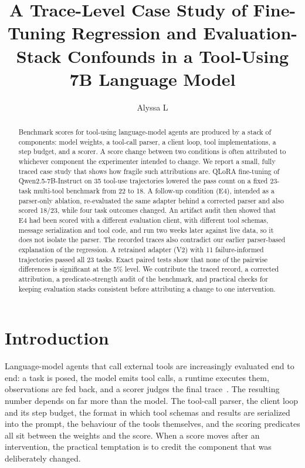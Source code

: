 \documentclass[runningheads]{llncs}
\begin{document}
%
\title{A Trace-Level Case Study of Fine-Tuning Regression and Evaluation-Stack Confounds in a Tool-Using 7B Language Model}
%
\author{Alyssa L}
%
\maketitle
%
\begin{abstract}
Benchmark scores for tool-using language-model agents are produced by a stack of components: model weights, a tool-call parser, a client loop, tool implementations, a step budget, and a scorer. A score change between two conditions is often attributed to whichever component the experimenter intended to change. We report a small, fully traced case study that shows how fragile such attributions are. QLoRA fine-tuning of Qwen2.5-7B-Instruct on 35 tool-use trajectories lowered the pass count on a fixed 23-task multi-tool benchmark from 22 to 18. A follow-up condition (E4), intended as a parser-only ablation, re-evaluated the same adapter behind a corrected parser and also scored 18/23, while four task outcomes changed. An artifact audit then showed that E4 had been scored with a different evaluation client, with different tool schemas, message serialization and tool code, and run two weeks later against live data, so it does not isolate the parser. The recorded traces also contradict our earlier parser-based explanation of the regression. A retrained adapter (V2) with 11 failure-informed trajectories passed all 23 tasks. Exact paired tests show that none of the pairwise differences is significant at the 5\% level. We contribute the traced record, a corrected attribution, a predicate-strength audit of the benchmark, and practical checks for keeping evaluation stacks consistent before attributing a change to one intervention.

\end{abstract}
%
\section{Introduction}
\label{sec:intro}

Language-model agents that call external tools are increasingly evaluated end to end: a task is posed, the model emits tool calls, a runtime executes them, observations are fed back, and a scorer judges the final trace~\cite{yao2023react,schick2023toolformer,mialon2023alm}. The resulting number depends on far more than the model. The tool-call parser, the client loop and its step budget, the format in which tool schemas and results are serialized into the prompt, the behaviour of the tools themselves, and the scoring predicates all sit between the weights and the score. When a score moves after an intervention, the practical temptation is to credit the component that was deliberately changed.
\end{document}
